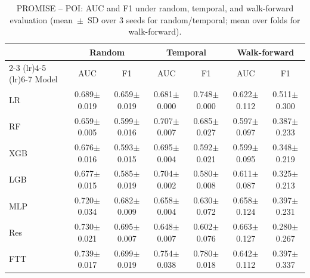 \begin{table}[htbp]
\centering
\caption{PROMISE -- POI: AUC and F1 under random, temporal, and walk-forward evaluation (mean~$\pm$~SD over 3 seeds for random/temporal; mean over folds for walk-forward).}
\label{tab:supp-poi}
\scriptsize
\begin{tabular}{l cc cc cc}
\toprule
 & \multicolumn{2}{c}{Random} & \multicolumn{2}{c}{Temporal} & \multicolumn{2}{c}{Walk-forward} \\
\cmidrule(lr){2-3} \cmidrule(lr){4-5} \cmidrule(lr){6-7}
Model & AUC & F1 & AUC & F1 & AUC & F1 \\
\midrule
LR & 0.689$\pm$0.019 & 0.659$\pm$0.019 & 0.681$\pm$0.000 & 0.748$\pm$0.000 & 0.622$\pm$0.112 & 0.511$\pm$0.300 \\
RF & 0.659$\pm$0.005 & 0.599$\pm$0.016 & 0.707$\pm$0.007 & 0.685$\pm$0.027 & 0.597$\pm$0.097 & 0.387$\pm$0.233 \\
XGB & 0.676$\pm$0.016 & 0.593$\pm$0.015 & 0.695$\pm$0.004 & 0.592$\pm$0.021 & 0.599$\pm$0.095 & 0.348$\pm$0.219 \\
LGB & 0.677$\pm$0.015 & 0.585$\pm$0.019 & 0.704$\pm$0.002 & 0.580$\pm$0.008 & 0.611$\pm$0.087 & 0.325$\pm$0.213 \\
MLP & 0.720$\pm$0.034 & 0.682$\pm$0.009 & 0.658$\pm$0.004 & 0.630$\pm$0.072 & 0.658$\pm$0.124 & 0.397$\pm$0.231 \\
Res & 0.730$\pm$0.021 & 0.695$\pm$0.007 & 0.648$\pm$0.007 & 0.602$\pm$0.076 & 0.663$\pm$0.127 & 0.280$\pm$0.267 \\
FTT & 0.739$\pm$0.017 & 0.699$\pm$0.019 & 0.754$\pm$0.038 & 0.780$\pm$0.018 & 0.642$\pm$0.112 & 0.397$\pm$0.337 \\
\bottomrule
\end{tabular}
\end{table}

